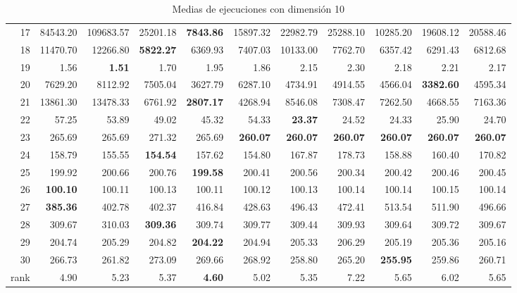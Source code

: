 \begin{table}[h!]
{\begin{tabular}{rrrrrrrrrrr}
  17 & 84543.20 & 109683.57 & 25201.18 & \textbf{7843.86} & 15897.32 & 22982.79 & 25288.10 & 10285.20 & 19608.12 & 20588.46 \\
  18 & 11470.70 & 12266.80 & \textbf{5822.27} & 6369.93 & 7407.03 & 10133.00 & 7762.70 & 6357.42 & 6291.43 & 6812.68 \\
  19 & 1.56 & \textbf{1.51} & 1.70 & 1.95 & 1.86 & 2.15 & 2.30 & 2.18 & 2.21 & 2.17 \\
  20 & 7629.20 & 8112.92 & 7505.04 & 3627.79 & 6287.10 & 4734.91 & 4914.55 & 4566.04 & \textbf{3382.60} & 4595.34 \\
  21 & 13861.30 & 13478.33 & 6761.92 & \textbf{2807.17} & 4268.94 & 8546.08 & 7308.47 & 7262.50 & 4668.55 & 7163.36 \\
  22 & 57.25 & 53.89 & 49.02 & 45.32 & 54.33 & \textbf{23.37} & 24.52 & 24.33 & 25.90 & 24.70 \\
  23 & 265.69 & 265.69 & 271.32 & 265.69 & \textbf{260.07} & \textbf{260.07} & \textbf{260.07} & \textbf{260.07} & \textbf{260.07} & \textbf{260.07} \\
  24 & 158.79 & 155.55 & \textbf{154.54} & 157.62 & 154.80 & 167.87 & 178.73 & 158.88 & 160.40 & 170.82 \\
  25 & 199.92 & 200.66 & 200.76 & \textbf{199.58} & 200.41 & 200.56 & 200.34 & 200.42 & 200.46 & 200.45 \\
  26 & \textbf{100.10} & 100.11 & 100.13 & 100.11 & 100.12 & 100.13 & 100.14 & 100.14 & 100.15 & 100.14 \\
  27 & \textbf{385.36} & 402.78 & 402.37 & 416.84 & 428.63 & 496.43 & 472.41 & 513.54 & 511.90 & 496.66 \\
  28 & 309.67 & 310.03 & \textbf{309.36} & 309.74 & 309.77 & 309.44 & 309.93 & 309.64 & 309.72 & 309.67 \\
  29 & 204.74 & 205.29 & 204.82 & \textbf{204.22} & 204.94 & 205.33 & 206.29 & 205.19 & 205.36 & 205.16 \\
  30 & 266.73 & 261.82 & 273.09 & 269.66 & 268.92 & 258.80 & 265.20 & \textbf{255.95} & 259.86 & 260.71 \\
  rank & 4.90 & 5.23 & 5.37 & \textbf{4.60} & 5.02 & 5.35 & 7.22 & 5.65 & 6.02 & 5.65 \\
   \hline
\end{tabular}%
}
\endgroup
\caption{Medias de ejecuciones con dimensión 10}
\label{d10}
\end{table}
